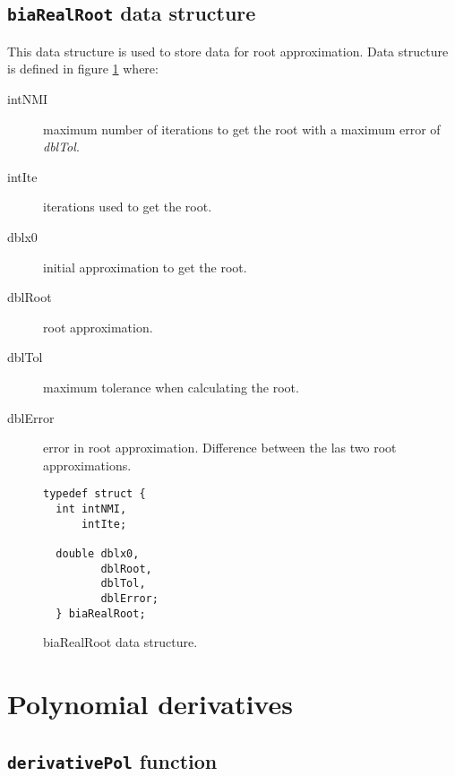 \subsection{\texttt{biaRealRoot} data structure} \label{sec:biaRealRoot}

This data structure is used to store data for root approximation. Data structure is defined in figure \ref{fig:biaRealRoot} where:

\begin{description}
\item[intNMI] maximum number of iterations to get the root with a maximum error of \emph{dblTol}.
\item[intIte] iterations used to get the root.
\item[dblx0] initial approximation to get the root.
\item[dblRoot] root approximation.
\item[dblTol] maximum tolerance when calculating the root.
\item[dblError] error in root approximation. Difference between the las two root approximations.
\end{description}

\begin{figure}[!h]
\begin{verbatim}
typedef struct {
  int intNMI,
      intIte;

  double dblx0,
         dblRoot,
         dblTol,
         dblError;
  } biaRealRoot;
\end{verbatim}
\caption{biaRealRoot data structure.} \label{fig:biaRealRoot}
\end{figure}

\FloatBarrier

\section{Polynomial derivatives}

\subsection{\texttt{derivativePol} function}

